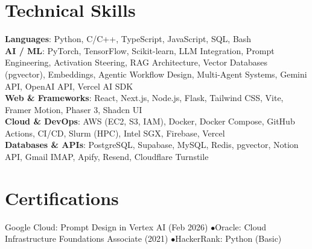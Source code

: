 \documentclass[letterpaper,11pt]{article}
\begin{document}
\section{Technical Skills}
 \begin{itemize}[leftmargin=0.15in, label={}]
    \small{\item{
     \textbf{Languages}{: Python, C/C++, TypeScript, JavaScript, SQL, Bash} \\
     \textbf{AI / ML}{: PyTorch, TensorFlow, Scikit-learn, LLM Integration, Prompt Engineering, Activation Steering, RAG Architecture, Vector Databases (pgvector), Embeddings, Agentic Workflow Design, Multi-Agent Systems, Gemini API, OpenAI API, Vercel AI SDK} \\
     \textbf{Web \& Frameworks}{: React, Next.js, Node.js, Flask, Tailwind CSS, Vite, Framer Motion, Phaser 3, Shadcn UI} \\
     \textbf{Cloud \& DevOps}{: AWS (EC2, S3, IAM), Docker, Docker Compose, GitHub Actions, CI/CD, Slurm (HPC), Intel SGX, Firebase, Vercel} \\
     \textbf{Databases \& APIs}{: PostgreSQL, Supabase, MySQL, Redis, pgvector, Notion API, Gmail IMAP, Apify, Resend, Cloudflare Turnstile}
    }}
 \end{itemize}

\section{Certifications}
 \begin{itemize}[leftmargin=0.15in, label={}]
    \small{\item{
     Google Cloud: Prompt Design in Vertex AI (Feb 2026) \quad$\bullet$\quad Oracle: Cloud Infrastructure Foundations Associate (2021) \quad$\bullet$\quad HackerRank: Python (Basic)
    }}
 \end{itemize}
\end{document}
